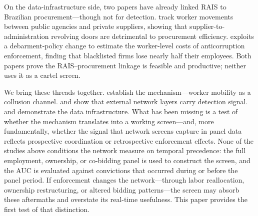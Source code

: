 On the data-infrastructure side, two papers have already linked RAIS to Brazilian procurement---though not for detection. \citet{barbosa2020revolving} track worker movements between public agencies and private suppliers, showing that supplier-to-administration revolving doors are detrimental to procurement efficiency. \citet{szerman2023employee} exploits a debarment-policy change to estimate the worker-level costs of anticorruption enforcement, finding that blacklisted firms lose nearly half their employees. Both papers prove the RAIS--procurement linkage is feasible and productive; neither uses it as a cartel screen.

We bring these threads together. \citet{lamichhane2024collusion} establish the mechanism---worker mobility as a collusion channel. \citet{asai2026ownership} and \citet{villamil2024collusion} show that external network layers carry detection signal. \citet{barbosa2020revolving} and \citet{szerman2023employee} demonstrate the data infrastructure. What has been missing is a test of whether the mechanism translates into a working screen---and, more fundamentally, whether the signal that network screens capture in panel data reflects prospective coordination or retrospective enforcement effects. None of the studies above conditions the network measure on temporal precedence: the full employment, ownership, or co-bidding panel is used to construct the screen, and the AUC is evaluated against convictions that occurred during or before the panel period. If enforcement changes the network---through labor reallocation, ownership restructuring, or altered bidding patterns---the screen may absorb these aftermaths and overstate its real-time usefulness. This paper provides the first test of that distinction.
